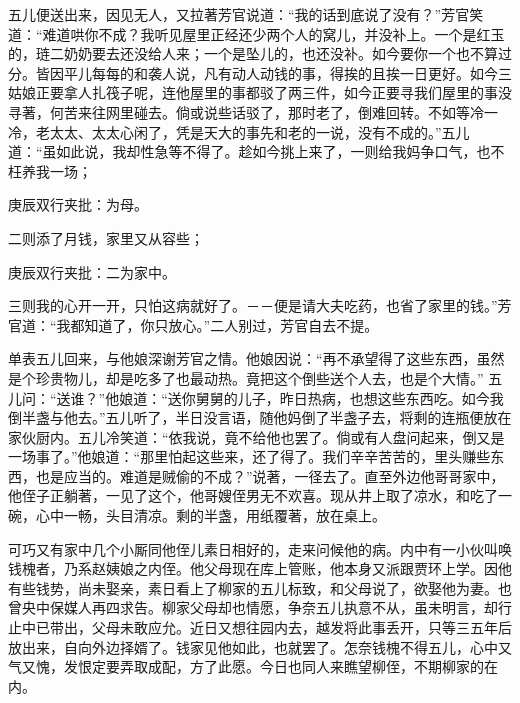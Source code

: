 \begin{parag}


    五儿便送出来，因见无人，又拉著芳官说道：“我的话到底说了没有？”芳官笑道：“难道哄你不成？我听见屋里正经还少两个人的窝儿，并没补上。一个是红玉的，琏二奶奶要去还没给人来；一个是坠儿的，也还没补。如今要你一个也不算过分。皆因平儿每每的和袭人说，凡有动人动钱的事，得挨的且挨一日更好。如今三姑娘正要拿人扎筏子呢，连他屋里的事都驳了两三件，如今正要寻我们屋里的事没寻著，何苦来往网里碰去。倘或说些话驳了，那时老了，倒难回转。不如等冷一冷，老太太、太太心闲了，凭是天大的事先和老的一说，没有不成的。”五儿道：“虽如此说，我却性急等不得了。趁如今挑上来了，一则给我妈争口气，也不枉养我一场；\begin{note}庚辰双行夹批：为母。\end{note}二则添了月钱，家里又从容些；\begin{note}庚辰双行夹批：二为家中。\end{note}三则我的心开一开，只怕这病就好了。－－便是请大夫吃药，也省了家里的钱。”芳官道：“我都知道了，你只放心。”二人别过，芳官自去不提。
\end{parag}


\begin{parag}


    单表五儿回来，与他娘深谢芳官之情。他娘因说：“再不承望得了这些东西，虽然是个珍贵物儿，却是吃多了也最动热。竟把这个倒些送个人去，也是个大情。” 五儿问：“送谁？”他娘道：“送你舅舅的儿子，昨日热病，也想这些东西吃。如今我倒半盏与他去。”五儿听了，半日没言语，随他妈倒了半盏子去，将剩的连瓶便放在家伙厨内。五儿冷笑道：“依我说，竟不给他也罢了。倘或有人盘问起来，倒又是一场事了。”他娘道：“那里怕起这些来，还了得了。我们辛辛苦苦的，里头赚些东西，也是应当的。难道是贼偷的不成？”说著，一径去了。直至外边他哥哥家中，他侄子正躺著，一见了这个，他哥嫂侄男无不欢喜。现从井上取了凉水，和吃了一碗，心中一畅，头目清凉。剩的半盏，用纸覆著，放在桌上。
\end{parag}


\begin{parag}


    可巧又有家中几个小厮同他侄儿素日相好的，走来问候他的病。内中有一小伙叫唤钱槐者，乃系赵姨娘之内侄。他父母现在库上管账，他本身又派跟贾环上学。因他有些钱势，尚未娶亲，素日看上了柳家的五儿标致，和父母说了，欲娶他为妻。也曾央中保媒人再四求告。柳家父母却也情愿，争奈五儿执意不从，虽未明言，却行止中已带出，父母未敢应允。近日又想往园内去，越发将此事丢开，只等三五年后放出来，自向外边择婿了。钱家见他如此，也就罢了。怎奈钱槐不得五儿，心中又气又愧，发恨定要弄取成配，方了此愿。今日也同人来瞧望柳侄，不期柳家的在内。
\end{parag}


